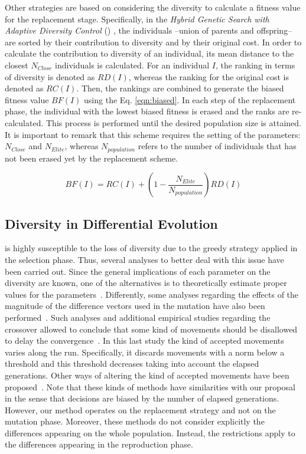 Other strategies are based on considering the diversity to calculate a fitness value for the replacement stage.
%
Specifically, in the \textit{Hybrid Genetic Search with Adaptive Diversity Control} (\HGSADC{}) \cite{vidal2013hybrid}, the individuals --union of parents and offspring-- are sorted by their contribution to diversity and by their original cost.
%
In order to calculate the contribution to diversity of an individual, its mean distance to the closest 
$N_{Close}$ individuals is calculated.
%
For an individual $I$, the ranking in terms of diversity is denoted as $RD(I)$, whereas the ranking for the original cost is denoted as $RC(I)$.
%
Then, the rankings are combined to generate the biased fitness value $BF(I)$ using the Eq. \ref{eqn:biased}.
%
In each step of the replacement phase, the individual with the lowest biased fitness is erased and the ranks are re-calculated.
%
This process is performed until the desired population size is attained.
%
It is important to remark that this scheme requires the setting of the parameters: $N_{Close}$ and $N_{Elite}$,
whereas $N_{population}$ refers to the number of individuals that has not been erased yet by the replacement scheme.

\begin{equation}\label{eqn:biased}
 BF(I) = RC(I) + \left(1- \frac{N_{Elite}}{N_{population}} \right) RD(I)
\end{equation}
\subsection{Diversity in Differential Evolution}

\DE{} is highly susceptible to the loss of diversity due to the greedy strategy applied in the selection phase.
%
Thus, several analyses to better deal with this issue have been carried out.
%
Since the general implications of each \DE{} parameter on the diversity are known, one of
the alternatives is to theoretically estimate proper values for the \DE{} parameters~\cite{zaharie2003control}.
%
Differently, some analyses regarding the effects of the magnitude of the difference vectors used in the mutation
have also been performed~\cite{montgomery2009differential}.
%
Such analyses and additional empirical studies regarding the crossover allowed to conclude that some kind of movements 
should be disallowed to delay the convergence~\cite{montgomery2012simple}.
%
In this last study the kind of accepted movements varies along the run.
%
Specifically, it discards movements with a norm below a threshold and this threshold decreases taking into account the elapsed generations.
%
Other ways of altering the kind of accepted movements have been proposed~\cite{bolufe2013differential}.
%
Note that these kinds of methods have similarities with our proposal in the sense that decisions are biased by the number of elapsed generations.
%
However, our method operates on the replacement strategy and not on the mutation phase.
%
Moreover, these methods do not consider explicitly the differences appearing on the whole population.
%
Instead, the restrictions apply to the differences appearing in the reproduction phase.

